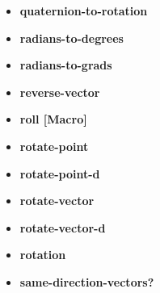 \documentclass [11pt]{book}
\begin{document}
\begin{itemize}
\item {}
\label{prim:quaternion-to-rotation}
\textbf{quaternion-to-rotation}





\item {}
\label{prim:radians-to-degrees}
\textbf{radians-to-degrees}





\item {}
\label{prim:radians-to-grads}
\textbf{radians-to-grads}





\item {}
\label{prim:reverse-vector}
\textbf{reverse-vector}





\item {}
\label{prim:roll}
\textbf{roll [Macro]}





\item {}
\label{prim:rotate-point}
\textbf{rotate-point}





\item {}
\label{prim:rotate-point-d}
\textbf{rotate-point-d}





\item {}
\label{prim:rotate-vector}
\textbf{rotate-vector}





\item {}
\label{prim:rotate-vector-d}
\textbf{rotate-vector-d}





\item {}
\label{prim:rotation}
\textbf{rotation}





\item {}
\label{prim:same-direction-vectors?}
\textbf{same-direction-vectors?}






\end{itemize}
\end{document}
